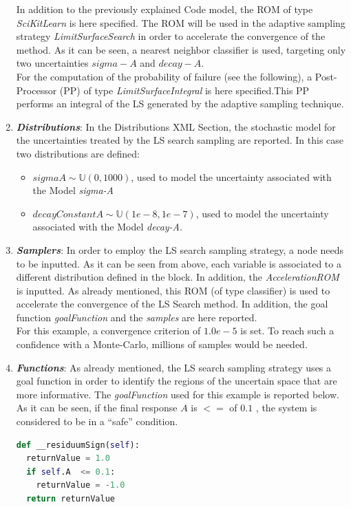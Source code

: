 \begin{enumerate}
 In addition to the previously explained Code
 model,
 the ROM of type \textit{SciKitLearn} is here specified. The ROM will be
 used in the adaptive sampling strategy \textit{LimitSurfaceSearch} in
 order to accelerate the convergence of the method. As it can be seen,
 a nearest neighbor classifier is used, targeting only two uncertainties
 $sigma-A$ and $decay-A$.
 \\ For the computation of the probability of failure (see the following), a
 Post-Processor (PP) of type \textit{LimitSurfaceIntegral} is here
 specified.This PP performs an integral of the LS
 generated by the adaptive sampling technique.
   \item \textbf{\textit{Distributions}}:
  In the Distributions XML Section, the stochastic model for the
  uncertainties  treated by the LS search sampling are reported. In
  this case two distributions are defined:
  \begin{itemize}
    \item $sigmaA \sim \mathbb{U}(0,1000)$, used to model the uncertainty
    associated with  the Model \textit{sigma-A}
    \item  $decayConstantA \sim \mathbb{U}(1e-8,1e-7)$,  used to
    model the uncertainty
    associated with  the Model \textit{decay-A}.
  \end{itemize}
   \item \textbf{\textit{Samplers}}:
  In order to employ the LS search sampling strategy, a
   node needs to be inputted.
  As it can be
  seen from above, each variable is associated to a different distribution
  defined in the   block.
  In addition, the \textit{AccelerationROM}   is inputted.
  As already mentioned, this ROM (of type classifier) is used to
  accelerate the convergence of the LS Search method.
  In addition, the goal function \textit{goalFunction}  and the
  \textit{samples} are here reported.
  \\For this example, a convergence criterion of $1.0e-5$ is set. To reach such a confidence with a Monte-Carlo, millions of
  samples would be needed.
   \item \textbf{\textit{Functions}}:
 As already mentioned, the LS search sampling strategy uses
 a goal function in order to identify the regions of the uncertain space
 that are more informative. The \textit{goalFunction} used for this
 example is reported below. As it can be seen, if the final response $A$
 is $<=$ of $0.1$ , the system is considered to be in a ``safe'' condition.
\begin{lstlisting}[language=python]
def __residuumSign(self):
  returnValue = 1.0
  if self.A  <= 0.1:
    returnValue = -1.0
  return returnValue
\end{lstlisting}


\end{enumerate}
